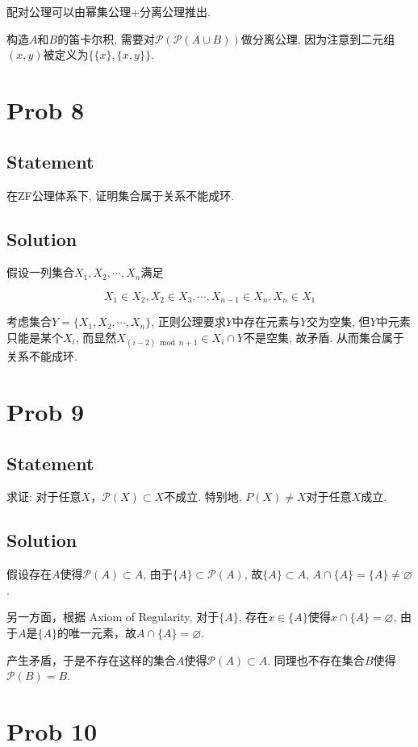 \documentclass[UTF-8]{ctexart}
\begin{document}
{\color{red}
	\section{}
	配对公理可以由幂集公理+分离公理推出.
	
	构造$A$和$B$的笛卡尔积, 需要对$\mathcal P(\mathcal P(A \cup B))$做分离公理, 因为注意到二元组$(x, y)$被定义为$\{\{x\}, \{x, y\}\}$.
}
{\color{blue}
\section{Prob 8}
\subsection{Statement}
在ZF公理体系下, 证明集合属于关系不能成环.
\subsection{Solution}
假设一列集合$X_1, X_2, \cdots, X_n$满足

$$X_1 \in X_2, X_2 \in X_3, \cdots, X_{n-1} \in X_n, X_n \in X_1$$

考虑集合$Y = \{X_1, X_2, \cdots, X_n\}$, 正则公理要求$Y$中存在元素与$Y$交为空集, 但$Y$中元素只能是某个$X_i$, 而显然$X_{(i-2) \bmod n + 1} \in X_i \cap Y$不是空集, 故矛盾. 从而集合属于关系不能成环.
}

\section{Prob 9}
\subsection{Statement}
求证: 对于任意$X$，$\mathcal P(X) \subset X$不成立. 特别地, $P(X) \neq X$对于任意$X$成立.
\subsection{Solution}
假设存在$A$使得$\mathcal P(A) \subset A$, 由于$\{A\} \subset \mathcal P(A)$, 故$\{A\} \subset A$, $A \cap \{A\} = \{A\} \neq \varnothing$.

另一方面，根据 Axiom of Regularity, 对于$\{A\}$, 存在$x \in \{A\}$使得$x \cap \{A\} = \varnothing$, 由于$A$是$\{A\}$的唯一元素，故$A \cap \{A\} = \varnothing$.

产生矛盾，于是不存在这样的集合$A$使得$\mathcal P(A) \subset A$. 同理也不存在集合$B$使得$\mathcal P(B) = B$.

\section{Prob 10}
\end{document}
